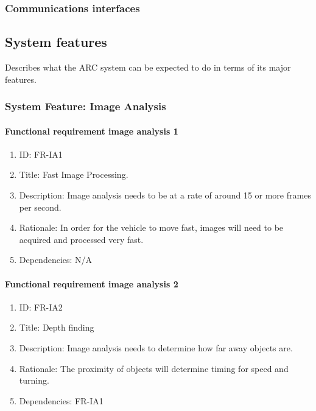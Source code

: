 \documentclass[compsoc,draftclsnofoot,onecolumn,10pt]{IEEEtran}
\begin{document}
	\subsubsection{Communications interfaces}


\subsection{System features}
Describes what the ARC system can be expected to do in terms of its major features.

\subsubsection{System Feature: Image Analysis}
	
	\paragraph{Functional requirement image analysis 1}
		\begin{enumerate}
			\item ID: FR-IA1
			\item Title: Fast Image Processing.
			\item Description: Image analysis needs to be at a rate of around 15 or more frames per second.
			\item Rationale: In order for the vehicle to move fast, images will need to be acquired and processed very fast.
			\item Dependencies: N/A
		\end{enumerate}	

	\paragraph{Functional requirement image analysis 2}
		\begin{enumerate}
			\item ID: FR-IA2
			\item Title: Depth finding
			\item Description: Image analysis needs to determine how far away objects are.
			\item Rationale: The proximity of objects will determine timing for speed and turning. 
			\item Dependencies: FR-IA1
		\end{enumerate}
	
\end{document}
